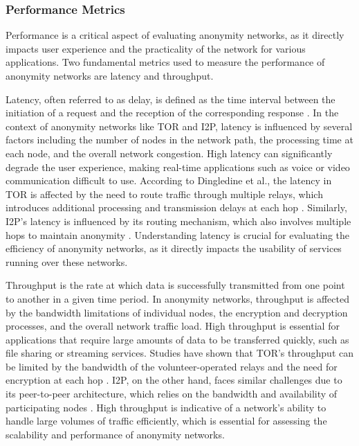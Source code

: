 \documentclass[12pt,conference]{IEEEtran}
\begin{document}
\subsubsection{Performance Metrics}
Performance is a critical aspect of evaluating anonymity networks, as it directly impacts user experience and the practicality of the network for various applications. Two fundamental metrics used to measure the performance of anonymity networks are latency and throughput.

Latency, often referred to as delay, is defined as the time interval between the initiation of a request and the reception of the corresponding response \cite{dataAndComputerCommunications}. In the context of anonymity networks like TOR and I2P, latency is influenced by several factors including the number of nodes in the network path, the processing time at each node, and the overall network congestion. High latency can significantly degrade the user experience, making real-time applications such as voice or video communication difficult to use. According to Dingledine et al., the latency in TOR is affected by the need to route traffic through multiple relays, which introduces additional processing and transmission delays at each hop \cite{TorTheSecondGenerationOnionRouter}. Similarly, I2P's latency is influenced by its routing mechanism, which also involves multiple hops to maintain anonymity \cite{i2p}. Understanding latency is crucial for evaluating the efficiency of anonymity networks, as it directly impacts the usability of services running over these networks.

Throughput is the rate at which data is successfully transmitted from one point to another in a given time period. In anonymity networks, throughput is affected by the bandwidth limitations of individual nodes, the encryption and decryption processes, and the overall network traffic load. High throughput is essential for applications that require large amounts of data to be transferred quickly, such as file sharing or streaming services. Studies have shown that TOR's throughput can be limited by the bandwidth of the volunteer-operated relays and the need for encryption at each hop \cite{TorTheSecondGenerationOnionRouter}. I2P, on the other hand, faces similar challenges due to its peer-to-peer architecture, which relies on the bandwidth and availability of participating nodes \cite{i2p}. High throughput is indicative of a network's ability to handle large volumes of traffic efficiently, which is essential for assessing the scalability and performance of anonymity networks.
\end{document}
